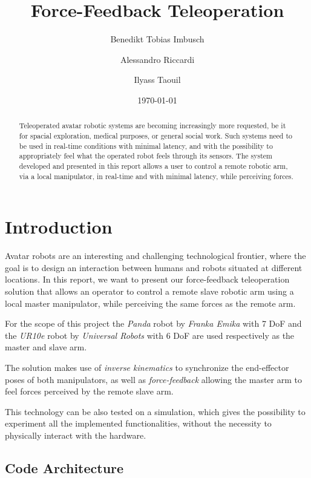 \documentclass[runningheads]{llncs}
\title{Force-Feedback Teleoperation}
\author{Benedikt Tobias Imbusch\inst{1} \and
	Alessandro Riccardi\inst{1} \and
	Ilyass Taouil\inst{1}}
\institute{
Computer Science Institute VI, Rheinische Friedrich-Wilhelms-Universität Bonn\\
\email{\{s6beimbu,s6alricc,s6iltaou\}@uni-bonn.de}}
\date{\today}
\begin{document}
\maketitle

\begin{abstract}
Teleoperated avatar robotic systems are becoming increasingly more requested, be it for spacial exploration, medical purposes, or general social work. Such systems need to be used in real-time conditions with minimal latency, and with the possibility to appropriately feel what the operated robot feels through its sensors. The system developed and presented in this report allows a user to control a remote robotic arm, via a local manipulator, in real-time and with minimal latency, while perceiving forces.
\end{abstract}


\section{Introduction}
\label{section:intro}


Avatar robots are an interesting and challenging technological frontier, where the goal is to design an interaction between humans and robots situated at different locations. In this report, we want to present our force-feedback teleoperation solution that allows an operator to control a remote slave robotic arm using a local master manipulator, while perceiving the same forces as the remote arm.

For the scope of this project the \textit{Panda} robot by \textit{Franka Emika} with 7 DoF and the \textit{UR10e} robot by \textit{Universal Robots} with 6 DoF are used respectively as the master and slave arm.

The solution makes use of \textit{inverse kinematics} to synchronize the end-effector poses of both manipulators, as well as \textit{force-feedback} allowing the master arm to feel forces perceived by the remote slave arm.

This technology can be also tested on a simulation, which gives the possibility to experiment all the implemented functionalities, without the necessity to physically interact with the hardware.


\subsection{Code Architecture}
\end{document}
